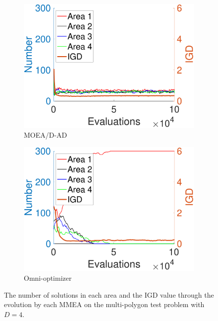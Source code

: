 \documentclass[conference]{IEEEtran}
\begin{document}
\begin{figure}[htbp]
    \begin{subfigure}[b]{.24\textwidth}
    \includegraphics[width=\linewidth]{Section5/dim4/Diversity/MOEADAD}
    \caption{MOEA/D-AD}
    \end{subfigure}
    \begin{subfigure}[b]{.24\textwidth}
    \includegraphics[width=\linewidth]{Section5/dim4/Diversity/OmniOptimizer}
    \caption{Omni-optimizer}
    \end{subfigure}
    \caption{The number of solutions in each area and the IGD value through the evolution by each MMEA on the multi-polygon test problem with $D=4$.}
    \label{fig: MMEAs Diversity dim=4}
\end{figure}
\end{document}
